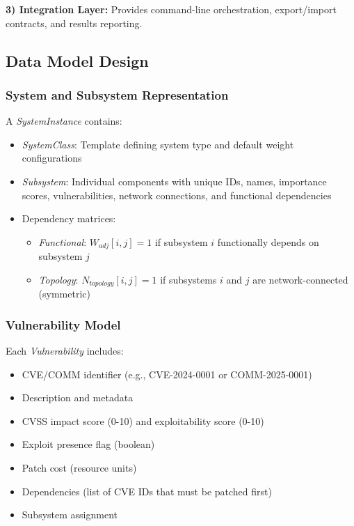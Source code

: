 \documentclass[conference]{IEEEtran}
\begin{document}
\textbf{3) Integration Layer:} Provides command-line orchestration, export/import contracts, and results reporting.

\subsection{Data Model Design}

\subsubsection{System and Subsystem Representation}
A \textit{SystemInstance} contains:
\begin{itemize}
    \item \textit{SystemClass}: Template defining system type and default weight configurations
    \item \textit{Subsystem}: Individual components with unique IDs, names, importance scores, vulnerabilities, network connections, and functional dependencies
    \item Dependency matrices:
    \begin{itemize}
        \item \textit{Functional}: $W_{adj}[i,j] = 1$ if subsystem $i$ functionally depends on subsystem $j$
        \item \textit{Topology}: $N_{topology}[i,j] = 1$ if subsystems $i$ and $j$ are network-connected (symmetric)
    \end{itemize}
\end{itemize}

\subsubsection{Vulnerability Model}
Each \textit{Vulnerability} includes:
\begin{itemize}
    \item CVE/COMM identifier (e.g., CVE-2024-0001 or COMM-2025-0001)
    \item Description and metadata
    \item CVSS impact score (0-10) and exploitability score (0-10)
    \item Exploit presence flag (boolean)
    \item Patch cost (resource units)
    \item Dependencies (list of CVE IDs that must be patched first)
    \item Subsystem assignment
\end{itemize}
\end{document}
